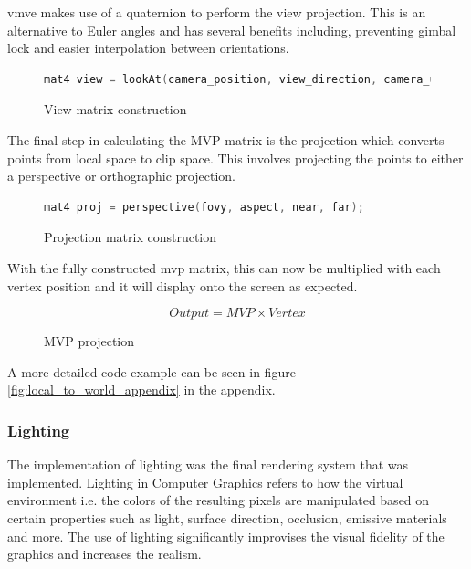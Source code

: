 \documentclass[11pt]{article}
\begin{document}
\gls*{vmve} makes use of a quaternion to perform the view projection. This is an
alternative to Euler angles and has several benefits including, preventing gimbal
lock and easier interpolation between orientations.
\begin{figure}[H]
  \centering
  \begin{lstlisting}[language=C++]
    mat4 view = lookAt(camera_position, view_direction, camera_up);
  \end{lstlisting}
  \caption{View matrix construction}
  \label{fig:world_to_view}
\end{figure}


The final step in calculating the MVP matrix is the projection which converts
points from local space to clip space. This involves projecting the points to
either a perspective or orthographic projection.
\begin{figure}[H]
  \centering
  \begin{lstlisting}[language=C++]
    mat4 proj = perspective(fovy, aspect, near, far);
  \end{lstlisting}
  \caption{Projection matrix construction}
  \label{fig:local_to_projection}
\end{figure}

With the fully constructed mvp matrix, this can now be multiplied with each
vertex position and it will display onto the screen as expected.
\begin{figure}[H]
  \centering  
  \begin{equation}
    Output = MVP \times Vertex
  \end{equation}
  \caption{MVP projection}
  \label{fig:mvp_projection}
\end{figure}

A more detailed code example can be seen in figure
\ref{fig:local_to_world_appendix} in the appendix.

\subsubsection{Lighting}
\newcommand{\intensity}{\operatorname{I}}
\newcommand{\lightdir}{\operatorname{L}}
\newcommand{\normal}{\operatorname{N}}
\newcommand{\diffuse}{\operatorname{D}}
\newcommand{\glslcolor}{\operatorname{C}}
\newcommand{\glslmax}{\operatorname{max}}

The implementation of lighting was the final rendering system that was
implemented. Lighting in Computer Graphics refers to how the virtual environment
i.e. the colors of the resulting pixels are manipulated based on certain
properties such as light, surface direction, occlusion, emissive materials and
more. The use of lighting significantly improvises the visual fidelity of the
graphics and increases the realism.
\end{document}
